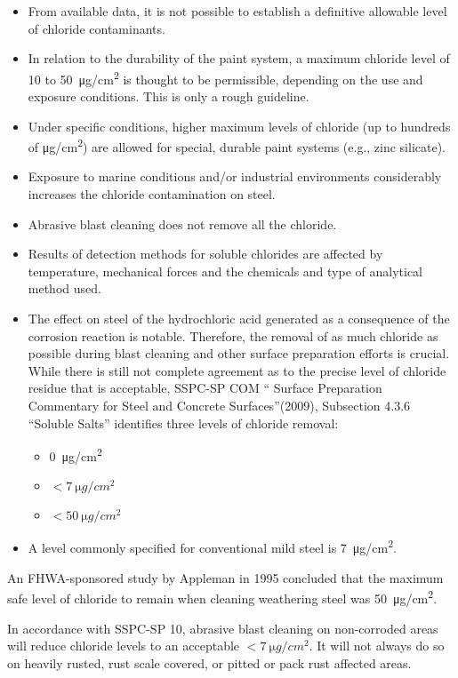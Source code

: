 \begin{itemize}
  \item From available data, it is not possible to establish a definitive allowable level of chloride contaminants.
  \item In relation to the durability of the paint system, a maximum chloride level of 10 to \qty{50}{\micro g/cm^2} is thought to be permissible, depending on the use and exposure conditions. This is only a rough guideline.
  \item Under specific conditions, higher maximum levels of chloride (up to hundreds of \unit{\micro g/cm^2}) are allowed for special, durable paint systems (e.g., zinc silicate).
  \item Exposure to marine conditions and/or industrial environments considerably increases the chloride contamination on steel.
  \item Abrasive blast cleaning does not remove all the chloride.
  \item Results of detection methods for soluble chlorides are affected by temperature, mechanical forces and the chemicals and type of analytical method used.
  \item The effect on steel of the hydrochloric acid generated as a consequence of the corrosion reaction is notable. Therefore, the removal of as much chloride as possible during blast cleaning and other surface preparation efforts is crucial. While there is still not complete agreement as to the precise level of chloride residue that is acceptable, SSPC-SP COM “ Surface Preparation Commentary for Steel and Concrete Surfaces”(2009), Subsection 4.3.6 “Soluble Salts” identifies three levels of chloride removal:
  \begin{itemize}
    \item \qty{0}{\micro g/cm^2}
    \item $< \qty{7}{\micro g/cm^2}$
    \item $< \qty{50}{\micro g/cm^2}$
  \end{itemize}
  \item A level commonly specified for conventional mild steel is \qty{7}{\micro g/cm^2}.
\end{itemize}

An FHWA-sponsored study by Appleman in 1995 concluded that the maximum safe level of chloride to remain when cleaning weathering steel was \qty{50}{\micro g/cm^2}.

In accordance with SSPC-SP 10, abrasive blast cleaning on non-corroded areas will reduce chloride levels to an acceptable $< \qty{7}{\micro g/cm^2}$. It will not always do so on heavily rusted, rust scale covered, or pitted or pack rust affected areas.

